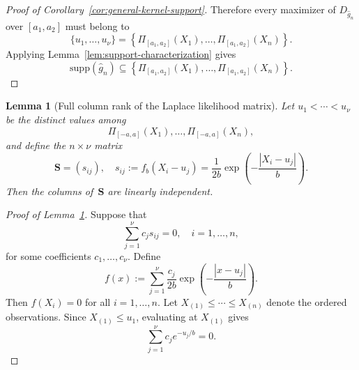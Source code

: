 \documentclass[english, 11pt]{article}
\newcommand{\supp}{\mathrm{supp}}
\theoremstyle{plain}
\newtheorem{lemma}[theorem]{Lemma}
\theoremstyle{definition}
\theoremstyle{remark}
\begin{document}
\begin{appendix}
\begin{proof}[Proof of Corollary~\ref{cor:general-kernel-support}]
Therefore every maximizer of $D_{\widehat g_n}$ over $[a_1,a_2]$ must belong to
\begin{equation*}
\{u_1,\dots,u_{\nu}\}=\left\{\Pi_{[a_1,a_2]}(X_1),\dots,\Pi_{[a_1,a_2]}(X_n)\right\}.
\end{equation*}
Applying Lemma~\ref{lem:support-characterization} gives
\begin{equation*}
\supp(\widehat g_n)\subseteq \left\{\Pi_{[a_1,a_2]}(X_1),\dots,\Pi_{[a_1,a_2]}(X_n)\right\}.
\end{equation*}
\end{proof}

\begin{lemma}[Full column rank of the Laplace likelihood matrix]\label{lem:laplace-full-rank}
Let $u_1<\cdots<u_\nu$ be the distinct values among
\begin{equation*}
\Pi_{[-a,a]}(X_1),\dots,\Pi_{[-a,a]}(X_n),
\end{equation*}
and define the $n\times \nu$ matrix
\begin{equation*}
\mathbf S=(s_{ij}),\quad s_{ij}:=f_b(X_i-u_j)=\frac{1}{2b}\exp\left(-\frac{|X_i-u_j|}{b}\right).
\end{equation*}
Then the columns of $\, \mathbf S$ are linearly independent.
\end{lemma}

\begin{proof}[Proof of Lemma~\ref{lem:laplace-full-rank}]
Suppose that
\begin{equation*}
\sum_{j=1}^\nu c_j s_{ij}=0,\quad i=1,\dots,n,
\end{equation*}
for some coefficients $c_1,\dots,c_\nu$. Define
\begin{equation*}
f(x):=\sum_{j=1}^\nu \frac{c_j}{2b}\exp\left(-\frac{|x-u_j|}{b}\right).
\end{equation*}
Then $f(X_i)=0$ for all $i=1,\dots,n$.
Let $X_{(1)}\le \cdots \le X_{(n)}$ denote the ordered observations. Since $X_{(1)}\le u_1$, evaluating at $X_{(1)}$ gives
\begin{equation}\label{eq:left-tail-identity}
\sum_{j=1}^\nu c_j e^{-u_j/b}=0.
\end{equation}


\end{proof}
\end{appendix}
\end{document}
